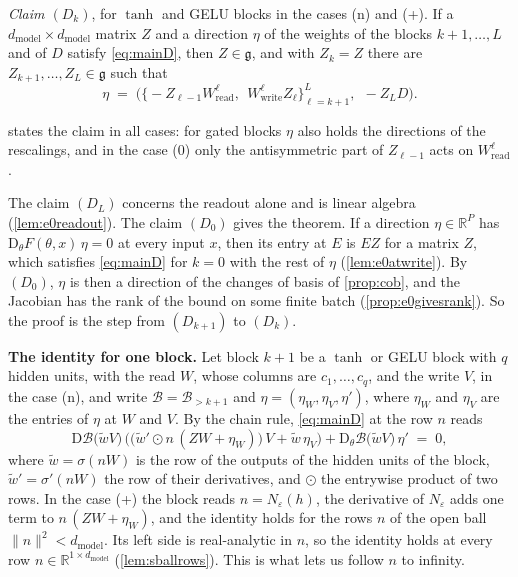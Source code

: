 \documentclass[10pt]{article}
\theoremstyle{definition}
\theoremstyle{remark}
\newcommand{\R}{\mathbb{R}}
\newcommand{\Wread}{W_{\mathrm{read}}}
\newcommand{\Wwrite}{W_{\mathrm{write}}}
\newcommand{\dm}{d_{\mathrm{model}}}
\newcommand{\Der}{\mathrm{D}}
\newcommand{\norm}[1]{\lVert #1\rVert}
\newcommand{\para}[1]{\smallskip\noindent\textbf{#1}\hspace{0.5em}}
\begin{document}
\smallskip
\noindent\emph{Claim $(D_k)$}, for $\tanh$ and GELU blocks in the cases (n) and (+). If a $\dm\times\dm$ matrix $Z$ and a direction $\eta$ of the weights of the blocks $k+1, \dots, L$ and of $D$ satisfy \eqref{eq:mainD}, then $Z \in \mathfrak g$, and with $Z_k = Z$ there are $Z_{k+1}, \dots, Z_L \in \mathfrak g$ such that
\[
\eta \;=\; \Big(\big\{-Z_{\ell-1}\Wread^{\ell},\ \ \Wwrite^{\ell}Z_\ell\big\}_{\ell=k+1}^{L},\ \ -Z_LD\Big).
\]
\smallskip

 states the claim in all cases: for gated blocks $\eta$ also holds the directions of the rescalings, and in the case (0) only the antisymmetric part of $Z_{\ell-1}$ acts on $\Wread^{\ell}$.

The claim $(D_L)$ concerns the readout alone and is linear algebra (\cref{lem:e0readout}). The claim $(D_0)$ gives the theorem. If a direction $\eta \in \R^P$ has $\Der_\theta F(\theta, x)\,\eta = 0$ at every input $x$, then its entry at $E$ is $EZ$ for a matrix $Z$, which satisfies \eqref{eq:mainD} for $k = 0$ with the rest of $\eta$ (\cref{lem:e0atwrite}). By $(D_0)$, $\eta$ is then a direction of the changes of basis of \cref{prop:cob}, and the Jacobian has the rank of the bound on some finite batch (\cref{prop:e0givesrank}). So the proof is the step from $(D_{k+1})$ to $(D_k)$.

\para{The identity for one block.} Let block $k+1$ be a $\tanh$ or GELU block with $q$ hidden units, with the read $W$, whose columns are $c_1, \dots, c_q$, and the write $V$, in the case (n), and write $\mathcal B = \mathcal B_{>k+1}$ and $\eta = (\eta_W, \eta_V, \eta')$, where $\eta_W$ and $\eta_V$ are the entries of $\eta$ at $W$ and $V$. By the chain rule, \eqref{eq:mainD} at the row $n$ reads
\begin{equation}\label{eq:mainL}
\Der\mathcal B\big(\tilde wV\big)\,\Big(\big(\tilde w'\odot n\,(ZW + \eta_W)\big)\,V + \tilde w\,\eta_V\Big) + \Der_\theta\mathcal B\big(\tilde wV\big)\,\eta' \;=\; 0 ,
\end{equation}
where $\tilde w = \sigma(nW)$ is the row of the outputs of the hidden units of the block, $\tilde w' = \sigma'(nW)$ the row of their derivatives, and $\odot$ the entrywise product of two rows. In the case (+) the block reads $n = N_\varepsilon(h)$, the derivative of $N_\varepsilon$ adds one term to $n\,(ZW + \eta_W)$, and the identity holds for the rows $n$ of the open ball $\norm{n}^2 < \dm$. Its left side is real-analytic in $n$, so the identity holds at every row $n \in \R^{1\times\dm}$ (\cref{lem:sballrows}). This is what lets us follow $n$ to infinity.
\end{document}
